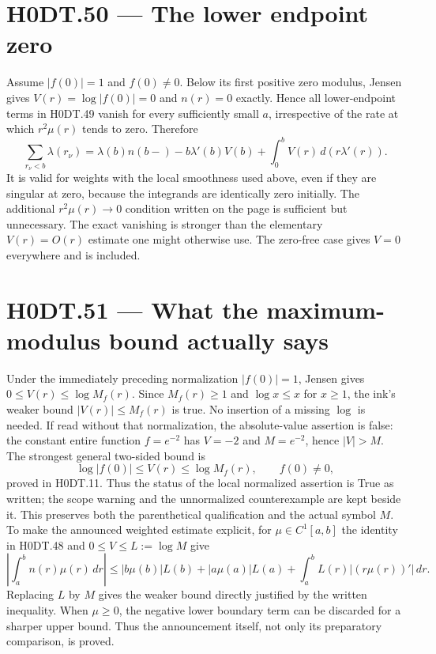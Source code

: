 \section*{H0DT.50 --- The lower endpoint zero}
Assume $|f(0)|=1$ and $f(0)\ne0$. Below its first positive zero modulus, Jensen gives $V(r)=\log|f(0)|=0$ and $n(r)=0$ exactly. Hence all lower-endpoint terms in H0DT.49 vanish for every sufficiently small $a$, irrespective of the rate at which $r^2\mu(r)$ tends to zero. Therefore
\[
 \sum_{r_\nu<b}\lambda(r_\nu)
 =\lambda(b)n(b-)-b\lambda'(b)V(b)
 +\int_0^b V(r)\,d(r\lambda'(r)).
\]
It is valid for weights with the local smoothness used above, even if they are singular at zero, because the integrands are identically zero initially. The additional $r^2\mu(r)\to0$ condition written on the page is sufficient but unnecessary. The exact vanishing is stronger than the elementary $V(r)=O(r)$ estimate one might otherwise use. The zero-free case gives $V=0$ everywhere and is included.

\section*{H0DT.51 --- What the maximum-modulus bound actually says}
Under the immediately preceding normalization $|f(0)|=1$, Jensen gives $0\le V(r)\le\log M_f(r)$. Since $M_f(r)\ge1$ and $\log x\le x$ for $x\ge1$, the ink's weaker bound $|V(r)|\le M_f(r)$ is true. No insertion of a missing $\log$ is needed. If read without that normalization, the absolute-value assertion is false: the constant entire function $f=e^{-2}$ has $V=-2$ and $M=e^{-2}$, hence $|V|>M$. The strongest general two-sided bound is
\[
 \log|f(0)|\le V(r)\le\log M_f(r),\qquad f(0)\ne0,
\]
proved in H0DT.11. Thus the status of the local normalized assertion is True as written; the scope warning and the unnormalized counterexample are kept beside it. This preserves both the parenthetical qualification and the actual symbol $M$. To make the announced weighted estimate explicit, for $\mu\in C^1[a,b]$ the identity in H0DT.48 and $0\le V\le L:=\log M$ give
\[
 \left|\int_a^b n(r)\mu(r)\,dr\right|
 \le |b\mu(b)|L(b)+|a\mu(a)|L(a)
       +\int_a^b L(r)|(r\mu(r))'|\,dr.
\]
Replacing $L$ by $M$ gives the weaker bound directly justified by the written inequality. When $\mu\ge0$, the negative lower boundary term can be discarded for a sharper upper bound. Thus the announcement itself, not only its preparatory comparison, is proved.

